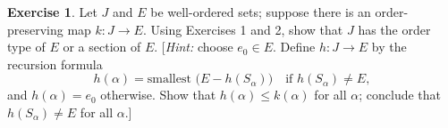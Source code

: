 \documentclass[11pt,a4paper,twoside]{article}
\theoremstyle{definition}
\newcounter{excounter}
\newtheorem{exercise}[excounter]{Exercise}
\begin{document}
\begin{exercise}

  Let $J$ and $E$ be well-ordered sets; suppose there is an order-preserving map $k : J \to E$.
  Using Exercises 1 and 2, show that $J$ has the order type of $E$ or a section of $E$. [\emph{Hint:}
    choose $e_0 \in E$. Define $h : J \to E$ by the recursion formula
    \begin{equation*}
      h ( \alpha ) = \text{smallest } \big( E - h ( S_\alpha ) \big) \quad\text{if } h ( S_\alpha ) \neq E,
    \end{equation*}
    and $h ( \alpha ) = e_0$ otherwise. Show that $h ( \alpha ) \leq k ( \alpha )$ for all $\alpha$;
  conclude that $h ( S_\alpha ) \neq E$ for all $\alpha$.]

\end{exercise}
\end{document}
